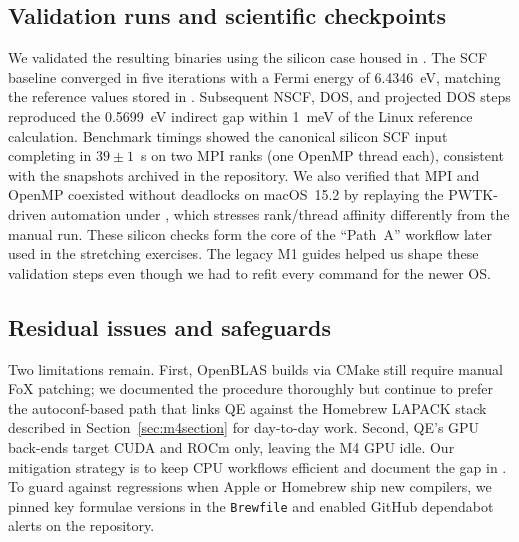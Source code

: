 \documentclass[12pt]{article}
\begin{document}
\subsection{Validation runs and scientific checkpoints}
We validated the resulting binaries using the silicon case housed in . The SCF baseline converged in five iterations with a Fermi energy of 6.4346~eV, matching the reference values stored in . Subsequent NSCF, DOS, and projected DOS steps reproduced the 0.5699~eV indirect gap within 1~meV of the Linux reference calculation. Benchmark timings showed the canonical silicon SCF input completing in $39\pm1$~s on two MPI ranks (one OpenMP thread each), consistent with the  snapshots archived in the repository. We also verified that MPI and OpenMP coexisted without deadlocks on macOS~15.2 by replaying the PWTK-driven automation under , which stresses rank/thread affinity differently from the manual run. These silicon checks form the core of the ``Path~A'' workflow later used in the stretching exercises. The legacy M1 guides helped us shape these validation steps even though we had to refit every command for the newer OS.

\subsection{Residual issues and safeguards}
Two limitations remain. First, OpenBLAS builds via CMake still require manual FoX patching; we documented the procedure thoroughly but continue to prefer the autoconf-based path that links QE against the Homebrew LAPACK stack described in Section~\ref{sec:m4section} for day-to-day work. Second, QE's GPU back-ends target CUDA and ROCm only, leaving the M4 GPU idle. Our mitigation strategy is to keep CPU workflows efficient and document the gap in . To guard against regressions when Apple or Homebrew ship new compilers, we pinned key formulae versions in the \texttt{Brewfile} and enabled GitHub dependabot alerts on the repository.
\end{document}
